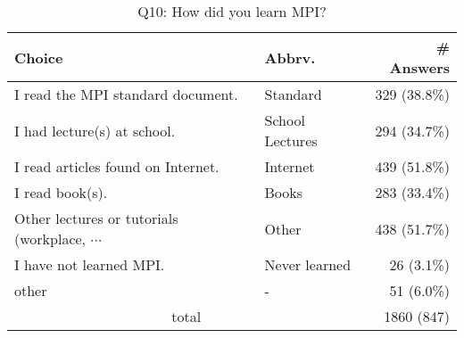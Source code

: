 \begin{table}[htb]%
\begin{center}%
\caption{Q10: How did you learn MPI?}%
\label{tab:Q10-ans}%
\begin{tabular}{l|l|r}%
\hline%
Choice & Abbrv. & \# Answers \\%
\hline%
I read the MPI standard document. & Standard & 329 (38.8\%) \\%
I had lecture(s) at school. & School Lectures & 294 (34.7\%) \\%
I read articles found on Internet. & Internet & 439 (51.8\%) \\%
I read book(s). & Books & 283 (33.4\%) \\%
{\small Other lectures or tutorials (workplace, $\cdots$} & Other & 438 (51.7\%) \\%
I have not learned MPI. & Never learned & 26 (3.1\%) \\%
other & - & 51 (6.0\%) \\%
\hline%
\multicolumn{2}{c}{total} & 1860 (847)\\%
\hline%
\end{tabular}%
\end{center}%
\end{table}%
